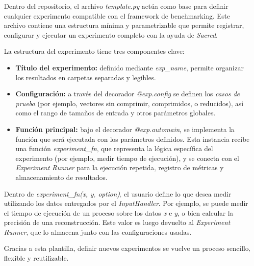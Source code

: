 Dentro del repositorio, el archivo \textit{template.py} actúa como base para definir cualquier experimento compatible con el framework de benchmarking. Este archivo contiene una estructura mínima y parametrizable que permite registrar, configurar y ejecutar un experimento completo con la ayuda de \textit{Sacred}.

La estructura del experimento tiene tres componentes clave:

\begin{itemize}
    \item \textbf{Título del experimento:} definido mediante \textit{exp\_name}, permite organizar los resultados en carpetas separadas y legibles.
    \item \textbf{Configuración:} a través del decorador \textit{@exp.config} se definen los \textit{casos de prueba} (por ejemplo, vectores sin comprimir, comprimidos, o reducidos), así como el rango de tamaños de entrada y otros parámetros globales.
    \item \textbf{Función principal:} bajo el decorador \textit{@exp.automain}, se implementa la función que será ejecutada con los parámetros definidos. Esta instancia recibe una función \textit{experiment\_fn}, que representa la lógica específica del experimento (por ejemplo, medir tiempo de ejecución), y se conecta con el \textit{Experiment Runner} para la ejecución repetida, registro de métricas y almacenamiento de resultados.
\end{itemize}

Dentro de \textit{experiment\_fn(x, y, option)}, el usuario define lo que desea medir utilizando los datos entregados por el \textit{InputHandler}. Por ejemplo, se puede medir el tiempo de ejecución de un proceso sobre los datos \textit{x} e \textit{y}, o bien calcular la precisión de una reconstrucción. Este valor es luego devuelto al \textit{Experiment Runner}, que lo almacena junto con las configuraciones usadas.

Gracias a esta plantilla, definir nuevos experimentos se vuelve un proceso sencillo, flexible y reutilizable.